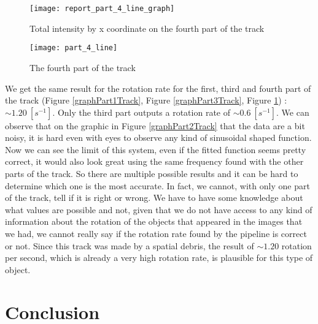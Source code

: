 \documentclass[a4paper,12pt,oneside]{report}
\begin{document}
\begin{figure}[h]
    \begin{minipage}[c]{.47\linewidth}
        \centering
        \texttt{[image: report\_part\_4\_line\_graph]}
        \caption{Total intensity by x coordinate on the fourth part of the track}
        \label{graphPart4Track}
    \end{minipage}
    \hfill
    \begin{minipage}[c]{.47\linewidth}
        \centering
        \texttt{[image: part\_4\_line]}
        \caption{The fourth part of the track}
    \end{minipage}
\end{figure}
\newline
\newline
\newline
\newline
\newline
We get the same result for the rotation rate for the first, third and fourth part of the track (Figure \ref{graphPart1Track}, 
Figure \ref{graphPart3Track}, Figure \ref{graphPart4Track}) : $\sim 1.20\ [s^{-1}]$. Only the third part outputs a rotation rate 
of $\sim 0.6\ [s^{-1}]$. We can observe that on the graphic in Figure \ref{graphPart2Track} that the data are a bit noisy, it is hard
even with eyes to observe any kind of sinusoidal shaped function. Now we can see the limit of this system, even if the fitted function 
seems pretty correct, it would also look great using the same frequency found with the other parts of the track. So there are multiple
possible results and it can be hard to determine which one is the most accurate. In fact, we cannot, with only one part of the track,
tell if it is right or wrong. We have to have some knowledge about what values are possible and not, given that we do not have access 
to any kind of information about the rotation of the objects that appeared in the images that we had, we cannot really say if the rotation
rate found by the pipeline is correct or not. 
\newline
Since this track was made by a spatial debris, the result of $\sim 1.20$ rotation per second, which is already a very high rotation rate, 
is plausible for this type of object. 


\chapter{Conclusion}
\end{document}
